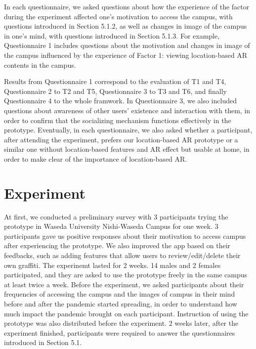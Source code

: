 In each questionnaire, we asked questions about how the experience of the factor during the experiment affected one's motivation to access the campus, with questions introduced in Section 5.1.2, as well as changes in image of the campus in one's mind, with questions introduced in Section 5.1.3.
For example, Questionnaire 1 includes questions about the motivation and changes in image of the campus influenced by the experience of Factor 1: viewing location-based AR contents in the campus.

Results from Questionnaire 1 correspond to the evaluation of T1 and T4, Questionnaire 2 to T2 and T5, Questionnaire 3 to T3 and T6, and finally Questionnaire 4 to the whole framwork.
In Questionnaire 3, we also included questions about awareness of other users' existence and interaction with them, in order to confirm that the socializing mechanism functions effectively in the prototype.
Eventually, in each questionnaire, we also asked whether a participant, after attending the experiment, prefers our location-based AR prototype or a similar one without location-based features and AR effect but usable at home,
in order to make clear of the importance of location-based AR.

\section{Experiment}

At first, we conducted a preliminary survey with 3 participants trying the prototype in Waseda University Nishi-Waseda Campus for one week.
3 participants gave us positive responses about their motivation to access campus after experiencing the prototype.
We also improved the app based on their feedbacks, such as adding features that allow users to review/edit/delete their own graffiti.
The experinemt lasted for 2 weeks. 14 males and 2 females participated,
and they are asked to use the prototype freely in the same campus at least twice a week.
Before the experiment, we asked participants about their frequencies of accessing the campus and the images of campus in their mind before and after the pandemic started spreading,
in order to understand how much impact the pandemic brought on each participant.
Instruction of using the prototype was also distributed before the experiment.
2 weeks later, after the experiment finished, participants were required to answer the questionnaires introduced in Section 5.1.

